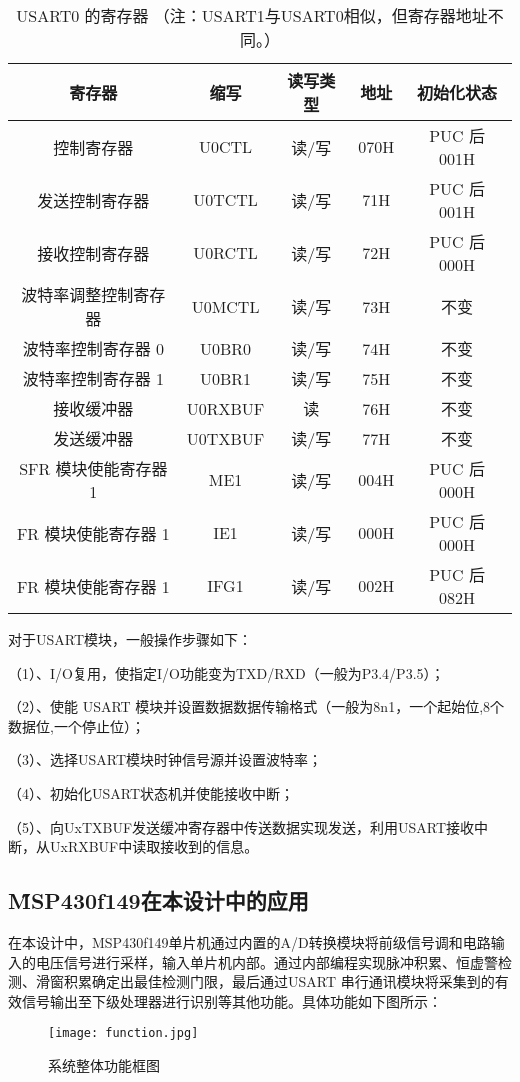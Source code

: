 \documentclass[12pt,a4paper]{article} %
\begin{document}
		
		
\begin{table}[h]
\caption{USART0 的寄存器 （注：USART1与USART0相似，但寄存器地址不同。）}

			\begin{tabular}{|c|c|c|c|c|}
			\hline
		寄存器 & 缩写 & 读写类型 & 地址	& 初始化状态  \\
		\hline
		控制寄存器 & U0CTL & 读/写 & 070H & PUC 后 001H \\
		\hline
		发送控制寄存器 & U0TCTL & 读/写 & 71H & PUC 后 001H \\
		\hline
		接收控制寄存器 & U0RCTL & 读/写 & 72H & PUC 后 000H \\
		\hline
		波特率调整控制寄存器 & U0MCTL & 读/写 & 73H & 不变 \\
		\hline
		波特率控制寄存器 0 & U0BR0 & 读/写 & 74H & 不变 \\
		\hline
		波特率控制寄存器 1 & U0BR1 & 读/写 & 75H & 不变 \\
		\hline
		接收缓冲器  & U0RXBUF & 读 & 76H & 不变 \\
		\hline
		发送缓冲器  & U0TXBUF & 读/写 & 77H & 不变 \\
		\hline
		SFR 模块使能寄存器 1  & ME1 & 读/写 & 004H & PUC 后 000H \\
		\hline
		FR 模块使能寄存器 1  & IE1 & 读/写 & 000H & PUC 后 000H \\
		\hline
		FR 模块使能寄存器 1  & IFG1 & 读/写 & 002H & PUC 后 082H \\
		\hline

\end{tabular}
\label{}
\end{table}




	 	对于USART模块，一般操作步骤如下：
	 	\par（1）、I/O复用，使指定I/O功能变为TXD/RXD（一般为P3.4/P3.5）；
	 	\par （2）、使能 USART 模块并设置数据数据传输格式（一般为8n1，一个起始位,8个数据位,一个停止位）；
	 	\par （3）、选择USART模块时钟信号源并设置波特率；
	 	\par （4）、初始化USART状态机并使能接收中断；
	 	\par （5）、向UxTXBUF发送缓冲寄存器中传送数据实现发送，利用USART接收中断，从UxRXBUF中读取接收到的信息。
	 \subsection{\H MSP430f149在本设计中的应用}
	 在本设计中，MSP430f149单片机通过内置的A/D转换模块将前级信号调和电路输入的电压信号进行采样，输入单片机内部。通过内部编程实现脉冲积累、恒虚警检测、滑窗积累确定出最佳检测门限，最后通过USART 串行通讯模块将采集到的有效信号输出至下级处理器进行识别等其他功能。具体功能如下图所示：
	 \begin{figure}[H] %
 		  \centering
 		  \texttt{[image: function.jpg]} 
  		  \caption{系统整体功能框图}
  		 \label{fig:2.1.2}
		\end{figure}
	 	
\end{document}
